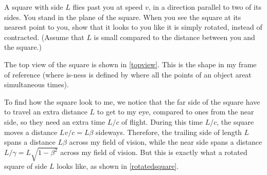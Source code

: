 \documentclass[english,a4paper,12pt]{report}
\begin{document}
{A square with side \(L\) flies past you at speed \(v\), in a direction parallel to two of its sides. You stand in the plane of the square. When you see the square at its nearest point to you, show that it looks to you like it is simply rotated, instead of contracted. (Assume that \(L\) is small compared to the distance between you and the square.)}
{The top view of the square is shown in \cref{topview}. This is the shape in my frame of reference (where is-ness is defined by where all the points of an object areat simultaneous times). 

To find how the square look to me, we notice that the far side of the square have to travel an extra distance \(L\) to get to my eye, compared to ones from the near side, so they need an extra time \(L/c\) of flight. During this time \(L/c\), the square moves a distance \(Lv/c = L \beta \) sideways. Therefore, the trailing side of length \(L\) spans a distance \(L \beta \) across my field of vision, while the near side spans a distance \(L /\gamma = L \sqrt{1-\beta ^2} \) across my field of vision. But this is exactly what a rotated square of side \(L\) looks like, as shown in \cref{rotatedsquare}.}


\end{document}
